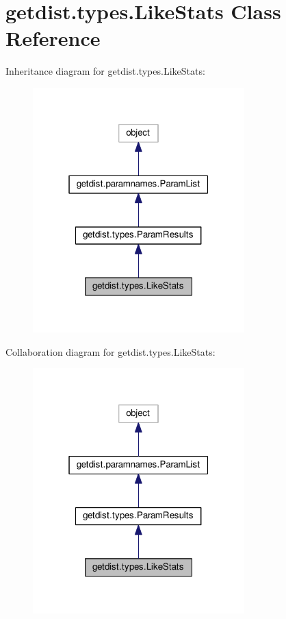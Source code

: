 \hypertarget{classgetdist_1_1types_1_1LikeStats}{}\section{getdist.\+types.\+Like\+Stats Class Reference}
\label{classgetdist_1_1types_1_1LikeStats}


Inheritance diagram for getdist.\+types.\+Like\+Stats\+:
\nopagebreak
\begin{figure}[H]
\begin{center}
\leavevmode
\includegraphics[width=232pt]{classgetdist_1_1types_1_1LikeStats__inherit__graph}
\end{center}
\end{figure}


Collaboration diagram for getdist.\+types.\+Like\+Stats\+:
\nopagebreak
\begin{figure}[H]
\begin{center}
\leavevmode
\includegraphics[width=232pt]{classgetdist_1_1types_1_1LikeStats__coll__graph}
\end{center}
\end{figure}
